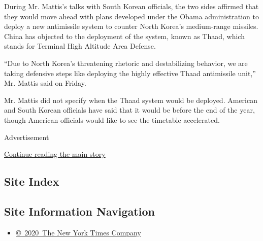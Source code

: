 During Mr. Mattis's talks with South Korean officials, the two sides
affirmed that they would move ahead with plans developed under the Obama
administration to deploy a new antimissile system to counter North
Korea's medium-range missiles. China has objected to the deployment of
the system, known as Thaad, which stands for Terminal High Altitude Area
Defense.

``Due to North Korea's threatening rhetoric and destabilizing behavior,
we are taking defensive steps like deploying the highly effective Thaad
antimissile unit,'' Mr. Mattis said on Friday.

Mr. Mattis did not specify when the Thaad system would be deployed.
American and South Korean officials have said that it would be before
the end of the year, though American officials would like to see the
timetable accelerated.

Advertisement

\protect\hyperlink{after-bottom}{Continue reading the main story}

\hypertarget{site-index}{%
\subsection{Site Index}\label{site-index}}

\hypertarget{site-information-navigation}{%
\subsection{Site Information
Navigation}\label{site-information-navigation}}

\begin{itemize}
\tightlist
\item
  \href{https://help.nytimes.com/hc/en-us/articles/115014792127-Copyright-notice}{©~2020~The
  New York Times Company}
\end{itemize}

